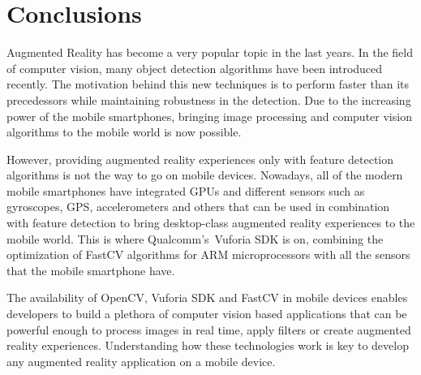 \chapter{Conclusions}
Augmented Reality has become a very popular topic in the last years. In the field of
computer vision, many object detection algorithms have been introduced recently. The
motivation behind this new techniques is to perform faster than its precedessors
while maintaining robustness in the detection. Due to the increasing power of the
mobile smartphones, bringing image processing and computer vision algorithms to the
mobile world is now possible.

However, providing augmented reality experiences only with feature detection
algorithms is not the way to go on mobile devices. Nowadays, all of the modern
mobile smartphones have integrated GPUs and different sensors such as gyroscopes,
GPS, accelerometers and others that can be used in combination with feature
detection to bring desktop-class augmented reality experiences to the mobile world. 
This is where Qualcomm's\textregistered~Vuforia SDK is on, combining the optimization of
FastCV algorithms for ARM microprocessors with all the sensors that the mobile
smartphone have. 

The availability of OpenCV, Vuforia SDK and FastCV in mobile devices enables
developers to build a plethora of computer vision based applications that can be
powerful enough to process images in real time, apply filters or create augmented
reality experiences. Understanding how these technologies work is key to develop any
augmented reality application on a mobile device.


